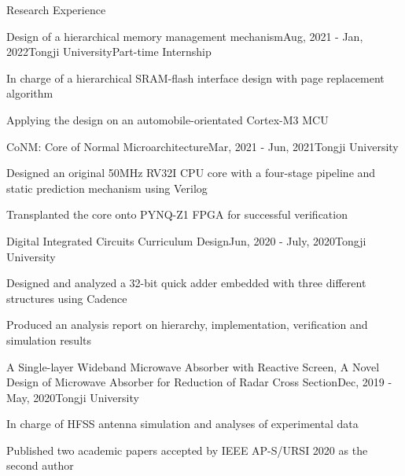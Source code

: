 \documentclass{resume} %
\begin{document}
\begin{rSection}{Research Experience}

	\begin{rSubsection}{Design of a hierarchical memory management mechanism}{Aug, 2021 - Jan, 2022}{Tongji University}{Part-time Internship}
		\item In charge of a hierarchical SRAM-flash interface design with page replacement algorithm
		\item Applying the design on an automobile-orientated Cortex-M3 MCU
	\end{rSubsection}
	
	\begin{rSubsection}{CoNM: Core of Normal Microarchitecture}{Mar, 2021 - Jun, 2021}{Tongji University}{}
		\item Designed an original 50MHz RV32I CPU core with a four-stage pipeline and static prediction mechanism using Verilog
		\item Transplanted the core onto PYNQ-Z1 FPGA for successful verification
	\end{rSubsection}

	\begin{rSubsection}{Digital Integrated Circuits Curriculum Design}{Jun, 2020 - July, 2020}{Tongji University}{}
		\item Designed and analyzed a 32-bit quick adder embedded with three different structures using Cadence
		\item Produced an analysis report on hierarchy, implementation, verification and simulation results 
	\end{rSubsection}

	\begin{rSubsection}{A Single-layer Wideband Microwave Absorber with Reactive Screen, A Novel Design of Microwave Absorber for Reduction of Radar Cross Section}{Dec, 2019 - May, 2020}{Tongji University}{}
		\item In charge of HFSS antenna simulation and analyses of experimental data
		\item Published two academic papers accepted by IEEE AP-S/URSI 2020 as the second author
	\end{rSubsection}

\end{rSection}
\end{document}
